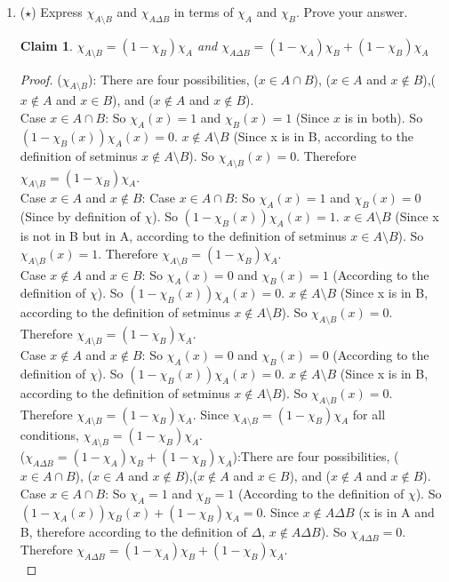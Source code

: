 \documentclass[11pt]{letter}
\newtheorem{claim}{Claim}
\theoremstyle{definition}
\begin{document}
\begin{enumerate}
\begin{enumerate}
	\end{enumerate}
      \item ($\star$) Express $\chi_{A\setminus B}$ and $\chi_{A\Delta B}$ in terms of $\chi_A$ and $\chi_B$. Prove your answer.
        \begin{claim}
          $\chi_{A\setminus B}=(1-\chi_B)\chi_A$ and $\chi_{A\Delta B}=(1-\chi_A)\chi_B+(1-\chi_B)\chi_A$ 
        \end{claim}
        \begin{proof}
          ($\chi_{A\setminus B}$): There are four possibilities, ($x\in A\cap B$), ($x\in A$ and $x\notin B$),($x\notin A$ and $x\in B$), and ($x\notin A$ and $x\notin B$).\\
          Case $x\in A\cap B$: So $\chi_A(x)=1$ and $\chi_B(x)=1$ (Since $x$ is in both). So $(1-\chi_B(x))\chi_A(x)=0$. $x\notin A\setminus B$ (Since x is in B, according to the definition of setminus $x\notin A\setminus B$). So $\chi_{A\setminus B}(x)=0$. Therefore $\chi_{A\setminus B}=(1-\chi_B)\chi_A$.\\
          Case $x\in A$ and $x\notin B$: Case $x\in A\cap B$: So $\chi_A(x)=1$ and $\chi_B(x)=0$ (Since by definition of $\chi$). So $(1-\chi_B(x))\chi_A(x)=1$. $x\in A\setminus B$ (Since x is not in B but in A, according to the definition of setminus $x\in A\setminus B$). So $\chi_{A\setminus B}(x)=1$. Therefore $\chi_{A\setminus B}=(1-\chi_B)\chi_A$.\\
          Case $x\notin A$ and $x\in B$: So $\chi_A(x)=0$ and $\chi_B(x)=1$ (According to the definition of $\chi$). So $(1-\chi_B(x))\chi_A(x)=0$. $x\notin A\setminus B$ (Since x is in B, according to the definition of setminus $x\notin A\setminus B$). So $\chi_{A\setminus B}(x)=0$. Therefore $\chi_{A\setminus B}=(1-\chi_B)\chi_A$.\\
          Case $x\notin A$ and $x\notin B$: So $\chi_A(x)=0$ and $\chi_B(x)=0$ (According to the definition of $\chi$). So $(1-\chi_B(x))\chi_A(x)=0$. $x\notin A\setminus B$ (Since x is in B, according to the definition of setminus $x\notin A\setminus B$). So $\chi_{A\setminus B}(x)=0$. Therefore $\chi_{A\setminus B}=(1-\chi_B)\chi_A$.
          Since $\chi_{A\setminus B}=(1-\chi_B)\chi_A$ for all conditions, $\chi_{A\setminus B}=(1-\chi_B)\chi_A$.\\
          ($\chi_{A\Delta B}=(1-\chi_A)\chi_B+(1-\chi_B)\chi_A$):There are four possibilities, ($x\in A\cap B$), ($x\in A$ and $x\notin B$),($x\notin A$ and $x\in B$), and ($x\notin A$ and $x\notin B$).\\
          Case $x\in A\cap B$: So $\chi_A=1$ and $\chi_B=1$ (According to the definition of $\chi$). So $(1-\chi_A(x))\chi_B(x)+(1-\chi_B)\chi_A=0$. Since $x\notin A\Delta B$ (x is in A and B, therefore according to the definition of $\Delta$, $x\notin A\Delta B$). So $\chi_{A\Delta B}=0$. Therefore  $\chi_{A\Delta B}=(1-\chi_A)\chi_B+(1-\chi_B)\chi_A$. \\

\end{proof}
\end{enumerate}
\end{document}
